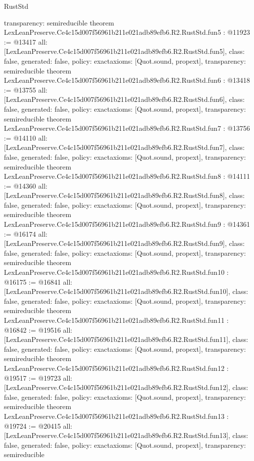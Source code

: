 \begin{lexlean}{RustStd}
\begin{coremodule}
{  transparency: semireducible
}
theorem LexLeanPreserve.Ce4c15d007f56961b211e021adb89efb6.R2.RustStd.fun5 : @11923 := @13417 {
  all: [LexLeanPreserve.Ce4c15d007f56961b211e021adb89efb6.R2.RustStd.fun5],
  class: false,
  generated: false,
  policy: exact{axioms: [Quot.sound, propext]},
  transparency: semireducible
}
theorem LexLeanPreserve.Ce4c15d007f56961b211e021adb89efb6.R2.RustStd.fun6 : @13418 := @13755 {
  all: [LexLeanPreserve.Ce4c15d007f56961b211e021adb89efb6.R2.RustStd.fun6],
  class: false,
  generated: false,
  policy: exact{axioms: [Quot.sound, propext]},
  transparency: semireducible
}
theorem LexLeanPreserve.Ce4c15d007f56961b211e021adb89efb6.R2.RustStd.fun7 : @13756 := @14110 {
  all: [LexLeanPreserve.Ce4c15d007f56961b211e021adb89efb6.R2.RustStd.fun7],
  class: false,
  generated: false,
  policy: exact{axioms: [Quot.sound, propext]},
  transparency: semireducible
}
theorem LexLeanPreserve.Ce4c15d007f56961b211e021adb89efb6.R2.RustStd.fun8 : @14111 := @14360 {
  all: [LexLeanPreserve.Ce4c15d007f56961b211e021adb89efb6.R2.RustStd.fun8],
  class: false,
  generated: false,
  policy: exact{axioms: [Quot.sound, propext]},
  transparency: semireducible
}
theorem LexLeanPreserve.Ce4c15d007f56961b211e021adb89efb6.R2.RustStd.fun9 : @14361 := @16174 {
  all: [LexLeanPreserve.Ce4c15d007f56961b211e021adb89efb6.R2.RustStd.fun9],
  class: false,
  generated: false,
  policy: exact{axioms: [Quot.sound, propext]},
  transparency: semireducible
}
theorem LexLeanPreserve.Ce4c15d007f56961b211e021adb89efb6.R2.RustStd.fun10 : @16175 := @16841 {
  all: [LexLeanPreserve.Ce4c15d007f56961b211e021adb89efb6.R2.RustStd.fun10],
  class: false,
  generated: false,
  policy: exact{axioms: [Quot.sound, propext]},
  transparency: semireducible
}
theorem LexLeanPreserve.Ce4c15d007f56961b211e021adb89efb6.R2.RustStd.fun11 : @16842 := @19516 {
  all: [LexLeanPreserve.Ce4c15d007f56961b211e021adb89efb6.R2.RustStd.fun11],
  class: false,
  generated: false,
  policy: exact{axioms: [Quot.sound, propext]},
  transparency: semireducible
}
theorem LexLeanPreserve.Ce4c15d007f56961b211e021adb89efb6.R2.RustStd.fun12 : @19517 := @19723 {
  all: [LexLeanPreserve.Ce4c15d007f56961b211e021adb89efb6.R2.RustStd.fun12],
  class: false,
  generated: false,
  policy: exact{axioms: [Quot.sound, propext]},
  transparency: semireducible
}
theorem LexLeanPreserve.Ce4c15d007f56961b211e021adb89efb6.R2.RustStd.fun13 : @19724 := @20415 {
  all: [LexLeanPreserve.Ce4c15d007f56961b211e021adb89efb6.R2.RustStd.fun13],
  class: false,
  generated: false,
  policy: exact{axioms: [Quot.sound, propext]},
  transparency: semireducible
}
\end{coremodule}
\end{lexlean}
